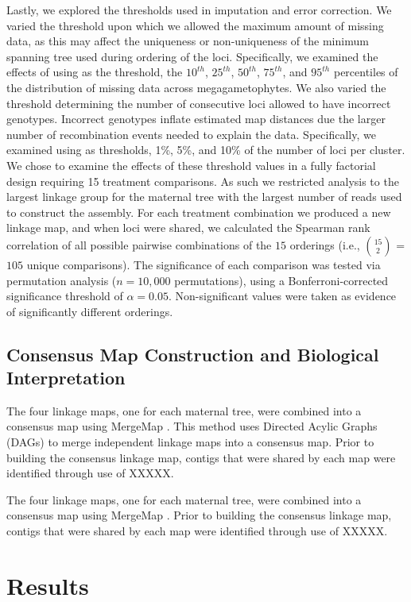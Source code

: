\documentclass[11pt]{article}
\begin{document}
Lastly, we explored the thresholds used in imputation and error correction. We varied the threshold upon which
we allowed the maximum amount of missing data, as this may affect the uniqueness 
or non-uniqueness of the minimum spanning tree used during ordering of the loci. Specifically,
we examined the effects of using as the threshold, the $10^{th}$, $25^{th}$, $50^{th}$, $75^{th}$, and $95^{th}$ percentiles of
the distribution of missing data across megagametophytes. We also varied the threshold determining 
the number of consecutive loci allowed to have incorrect genotypes. Incorrect genotypes inflate estimated
map distances due the larger number of recombination events needed to explain the data. Specifically, we
examined using as thresholds, 1\%, 5\%, and 10\% of the number of loci per cluster. We chose to examine the 
effects of these threshold values in a fully factorial design requiring 15 treatment comparisons. As such we restricted
analysis to the largest linkage group for the maternal tree with the largest number of reads used to construct
the assembly. For each treatment combination we produced a new linkage map, and when loci were shared, we calculated
the Spearman rank correlation of all possible pairwise combinations of the $15$ orderings (i.e., {$15 \choose 2$} = $105$ unique
comparisons). The significance of each comparison was tested via permutation analysis ($n = 10,000$ permutations), 
using a Bonferroni-corrected significance threshold of $\alpha = 0.05$. Non-significant values were taken as evidence of significantly different orderings.

\subsection*{Consensus Map Construction and Biological Interpretation}
The four linkage maps, one for each maternal tree, were combined into a consensus map using MergeMap \citep{Wu:2008b}. This
method uses Directed Acylic Graphs (DAGs) to merge independent linkage maps into a consensus map. Prior to building the consensus 
linkage map, contigs that were shared by each map were identified through use of XXXXX.

The four linkage maps, one for each maternal tree, were combined into a consensus map using MergeMap \citep{Wu:2008b}. Prior to 
building the consensus linkage map, contigs that were shared by each map were identified through use of XXXXX.

\section*{Results}
\end{document}
